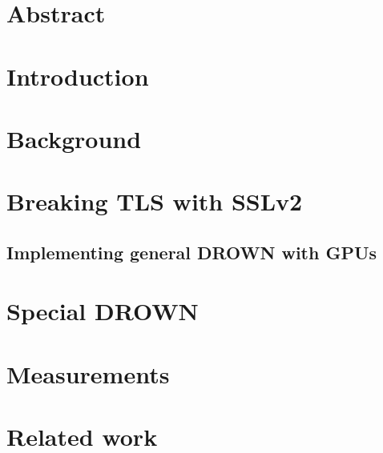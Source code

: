 \newcommand{\DrownPaper}{papers/drown/paper}
\newcommand{\DrownFigures}{papers/drown/figures}



\newif\ifext\extfalse
\newif\ifdraft\draftfalse
\newif\ifblind\blindtrue
\newif\ifsubmit\submitfalse

\draftfalse
\blindfalse



\section*{Abstract}


\section{Introduction}


\section{Background}


\section{Breaking TLS with SSLv2}


\subsection{Implementing general DROWN with GPUs} 


\section{Special DROWN}




\section{Measurements}


\section{Related work}


